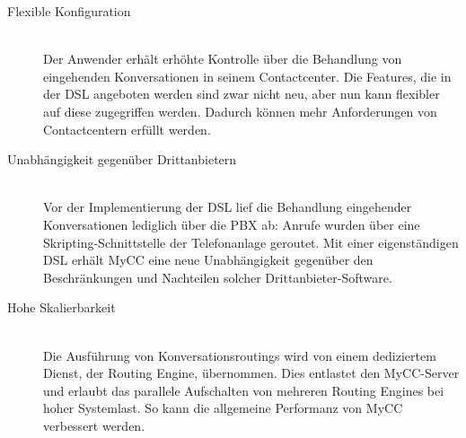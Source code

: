 \begin{description}
\item[Flexible Konfiguration] \hfill \\
Der Anwender erhält erhöhte Kontrolle über die Behandlung von eingehenden Konversationen in seinem Contactcenter. Die Features, die in der DSL angeboten werden sind zwar nicht neu, aber nun kann flexibler auf diese zugegriffen werden. Dadurch können mehr Anforderungen von Contactcentern erfüllt werden.
\item[Unabhängigkeit gegenüber Drittanbietern] \hfill \\
Vor der Implementierung der DSL lief die Behandlung eingehender Konversationen lediglich über die PBX ab: Anrufe wurden über eine Skripting-Schnittstelle der Telefonanlage geroutet. Mit einer eigenständigen DSL erhält MyCC eine neue Unabhängigkeit gegenüber den Beschränkungen und Nachteilen solcher Dritt\-an\-bie\-ter-Soft\-ware.
\item[Hohe Skalierbarkeit] \hfill \\
Die Ausführung von Konversationsroutings wird von einem dediziertem Dienst, der Routing Engine, übernommen. Dies entlastet den MyCC-Server und erlaubt das parallele Aufschalten von mehreren Routing Engines bei hoher Systemlast. So kann die allgemeine Performanz von MyCC verbessert werden.
\end{description}

